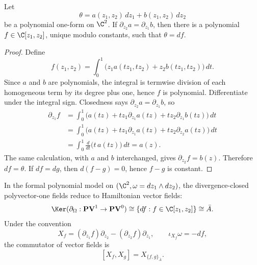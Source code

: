 \documentclass[11pt]{memoir}
\begin{document}
\begin{lem}\label{lem:polynomial-poincare}
  Let
  $$\theta=a(z_1,z_2)\,dz_1+b(z_1,z_2)\,dz_2$$
  be a polynomial one-form on $\C^2$. If
  $\partial_{z_2}a=\partial_{z_1}b$, then there is a polynomial
  $f\in\C[z_1,z_2]$, unique modulo constants, such that $\theta=df$.
\end{lem}

\begin{proof}
  Define
  $$f(z_1,z_2)=\int_0^1
    \bigl(z_1a(tz_1,tz_2)+z_2b(tz_1,tz_2)\bigr)\,dt.$$
  Since $a$ and $b$ are polynomials, the integral is termwise division of each
  homogeneous term by its degree plus one, hence $f$ is polynomial. Differentiate
  under the integral sign. Closedness says
  $\partial_{z_2}a=\partial_{z_1}b$, so
  \begin{align*}
  \partial_{z_1}f
    &=\int_0^1\bigl(a(tz)+tz_1\partial_{z_1}a(tz)
       +tz_2\partial_{z_1}b(tz)\bigr)\,dt\\
    &=\int_0^1\bigl(a(tz)+t z_1\partial_{z_1}a(tz)
       +t z_2\partial_{z_2}a(tz)\bigr)\,dt\\
    &=\int_0^1\frac{d}{dt}\bigl(t\,a(tz)\bigr)\,dt
      =a(z).
  \end{align*}
  The same calculation, with $a$ and $b$ interchanged, gives
  $\partial_{z_2}f=b(z)$. Therefore $df=\theta$.
  If $df=dg$, then $d(f-g)=0$, hence $f-g$ is constant.
\end{proof}

\begin{prop}\label{prop:hamiltonian-polyvector-reduction}
  In the formal polynomial model on $(\C^2,\omega=dz_1\wedge dz_2)$, the
  divergence-closed polyvector-one fields reduce to Hamiltonian vector fields:
  $$\Ker(\partial_{\Omega}:\mathbf{PV}^{1}\to\mathbf{PV}^{0})
    \cong \{df:f\in\C[z_1,z_2]\}
    \cong \bar A.$$
  Under the convention
  $$X_f=(\partial_{z_1}f)\partial_{z_2}
    -(\partial_{z_2}f)\partial_{z_1},\qquad \iota_{X_f}\omega=-df,$$
  the commutator of vector fields is
  $$[X_f,X_g]=X_{\{f,g\}_{\bar A}}.$$
\end{prop}
\end{document}

